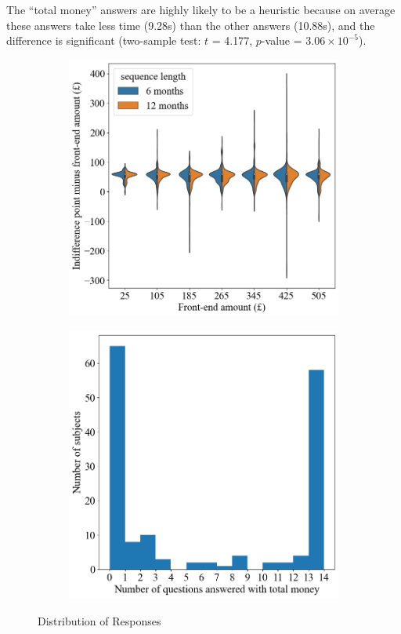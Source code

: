 \documentclass[
  12pt,
]{article}
\begin{document}
The ``total money'' answers are highly likely to be a heuristic because
on average these answers take less time (9.28s) than the other answers
(10.88s), and the difference is significant (two-sample test: \(t\) =
4.177, \(p\)-value = \(3.06\times10^{-5}\)).

\begin{figure}
    \centering
    \begin{subfigure}{0.5\textwidth}
        \centering
        \includegraphics[width=\linewidth]{figures/outlier.png} 
    \end{subfigure}
    \hfill
    \begin{subfigure}{0.49\textwidth}
        \centering
        \includegraphics[width=\linewidth]{figures/total_money.png} 
    \end{subfigure}
    \caption{Distribution of Responses}
    \label{fig:response_dist}
\end{figure}
\end{document}
